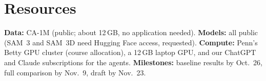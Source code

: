 \documentclass[11pt]{article}
\begin{document}
\section*{Resources}
\textbf{Data:} CA-1M (public; about 12\,GB, no application needed). \textbf{Models:} all public (SAM~3 and SAM~3D need Hugging Face access, requested). \textbf{Compute:} Penn's Betty GPU cluster (course allocation), a 12\,GB laptop GPU, and our ChatGPT and Claude subscriptions for the agents. \textbf{Milestones:} baseline results by Oct.~26, full comparison by Nov.~9, draft by Nov.~23.
\end{document}
